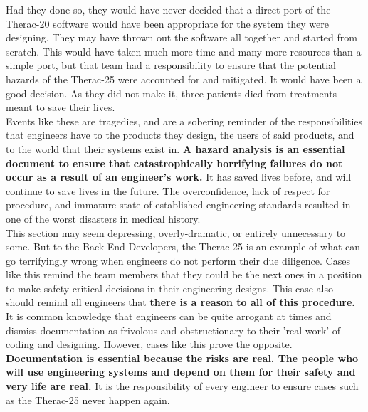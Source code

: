 \documentclass{article}
\begin{document}
Had they done so, they would have never decided that a direct port of the Therac-20 software would have been appropriate for the system they were designing. They may have thrown out the software all together and started from scratch. This would have taken much more time and many more resources than a simple port, but that team had a responsibility to ensure that the potential hazards of the Therac-25 were accounted for and mitigated. It would have been a good decision. As they did not make it, three patients died from treatments meant to save their lives.\\

Events like these are tragedies, and are a sobering reminder of the responsibilities that engineers have to the products they design, the users of said products, and to the world that their systems exist in. \textbf{A hazard analysis is an essential document to ensure that catastrophically horrifying failures do not occur as a result of an engineer's work.} It has saved lives before, and will continue to save lives in the future. The overconfidence, lack of respect for procedure, and immature state of established engineering standards resulted in one of the worst disasters in medical history.\\

This section may seem depressing, overly-dramatic, or entirely unnecessary to some. But to the Back End Developers, the Therac-25 is an example of what can go terrifyingly wrong when engineers do not perform their due diligence. Cases like this remind the team members that they could be the next ones in a position to make safety-critical decisions in their engineering designs. This case also should remind all engineers that \textbf{there is a reason to all of this procedure.} It is common knowledge that engineers can be quite arrogant at times and dismiss documentation as frivolous and obstructionary to their 'real work' of coding and designing. However, cases like this prove the opposite. \textbf{Documentation is essential because the risks are real. The people who will use engineering systems and depend on them for their safety and very life are real.} It is the responsibility of every engineer to ensure cases such as the Therac-25 never happen again.\\
\end{document}
